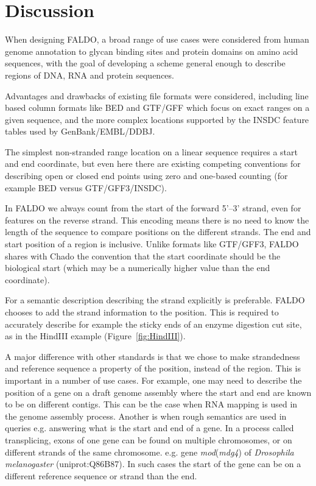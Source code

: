 \section*{Discussion}
When designing FALDO, a broad range of use cases were considered from
human genome annotation to glycan binding sites and protein domains on
amino acid sequences, with the goal of developing a scheme general enough
to describe regions of DNA, RNA and protein sequences.

Advantages and drawbacks of existing file formats were considered, including
line based column formats like BED and GTF/GFF which focus on exact
ranges on a given sequence, and the more complex locations supported
by the INSDC feature tables used by GenBank/EMBL/DDBJ.

The simplest non-stranded range location on a linear sequence requires
a start and end coordinate, but even here there are existing competing
conventions for describing open or closed end points using zero and
one-based counting (for example BED versus GTF/GFF3/INSDC).

In FALDO we always count from the start of the forward 5'--3' strand, even for features on the reverse strand.
This encoding means there is no need to know the length of the sequence to compare positions on the different strands.
The end and start position of a region is inclusive.
Unlike formats like GTF/GFF3, FALDO shares with Chado\cite{Chado2007} the convention
that the start coordinate should be the biological start
(which may be a numerically higher value than the end coordinate).



For a semantic description describing the strand explicitly is preferable.
FALDO chooses to add the strand information to the position. 
This is required to accurately describe for example the sticky ends
of an enzyme digestion cut site, as in the HindIII example (Figure~\ref{fig:HindIII}).

A major difference with other standards is that we chose to make strandedness and reference sequence a property of the position, instead of the region.
This is important in a number of use cases.
For example, one may need to describe the position of a gene on a draft genome assembly where the start and end are known to be on different contigs.
This can be the case when RNA mapping is used in the genome assembly process.
Another is when rough semantics are used in queries e.g. answering what is the start and end of a gene. 
In a process called transplicing, exons of one gene can be found on multiple chromosomes, or on different strands of the same chromosome.
e.g.  gene \textit{mod}(\textit{mdg4}) of \textit{Drosophila melanogaster} (uniprot:Q86B87).
In such cases the start of the gene can be on a different reference sequence or strand than the end.

